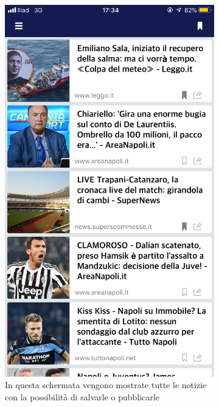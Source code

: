 \documentclass[numbers=noenddot, 12pt, a4paper, oneside]{scrbook}
\begin{document}
\begin{figure}[H]
	\begin{subfigure}{.5\textwidth}
		\centering
		\includegraphics[width=.8\linewidth]{images/Screen/News}
		\caption{In questa schermata vengono mostrate tutte le notizie con la possibilità di salvarle o pubblicarle}
	\end{subfigure}
	\begin{subfigure}{.5\textwidth}
		\centering

\end{subfigure}
\end{figure}
\end{document}
